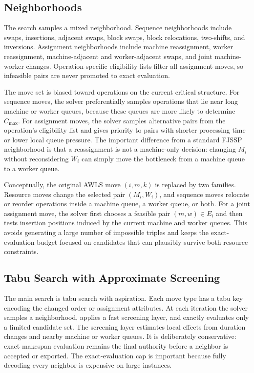 \documentclass[sigconf,anonymous,review,dvipsnames]{acmart}
\begin{document}
\subsection{Neighborhoods}
The search samples a mixed neighborhood.
Sequence neighborhoods include swaps, insertions, adjacent swaps, block swaps, block relocations, two-shifts, and inversions.
Assignment neighborhoods include machine reassignment, worker reassignment, machine-adjacent and worker-adjacent swaps, and joint machine-worker changes.
Operation-specific eligibility lists filter all assignment moves, so infeasible pairs are never promoted to exact evaluation.

The move set is biased toward operations on the current critical structure.
For sequence moves, the solver preferentially samples operations that lie near long machine or worker queues, because these queues are more likely to determine $C_{\max}$.
For assignment moves, the solver samples alternative pairs from the operation's eligibility list and gives priority to pairs with shorter processing time or lower local queue pressure.
The important difference from a standard FJSSP neighborhood is that a reassignment is not a machine-only decision: changing $M_i$ without reconsidering $W_i$ can simply move the bottleneck from a machine queue to a worker queue.

Conceptually, the original AWLS move $(i,m,k)$ is replaced by two families.
Resource moves change the selected pair $(M_i,W_i)$, and sequence moves relocate or reorder operations inside a machine queue, a worker queue, or both.
For a joint assignment move, the solver first chooses a feasible pair $(m,w)\in E_i$ and then tests insertion positions induced by the current machine and worker queues.
This avoids generating a large number of impossible triples and keeps the exact-evaluation budget focused on candidates that can plausibly survive both resource constraints.

\subsection{Tabu Search with Approximate Screening}
The main search is tabu search with aspiration.
Each move type has a tabu key encoding the changed order or assignment attributes.
At each iteration the solver samples a neighborhood, applies a fast screening layer, and exactly evaluates only a limited candidate set.
The screening layer estimates local effects from duration changes and nearby machine or worker queues.
It is deliberately conservative: exact makespan evaluation remains the final authority before a neighbor is accepted or exported.
The exact-evaluation cap is important because fully decoding every neighbor is expensive on large instances.
\end{document}
